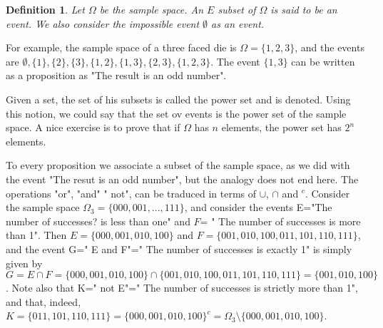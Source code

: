 \documentclass[12pt]{article}
\newtheorem{definition}[theorem]{Definition}
\newcommand{\<}{{\langle \!\! \langle}}
\renewcommand{\>}{{\rangle \!\! \rangle}}
\newcommand{\commento}[1]{
	\par\noindent
	\colorbox{light}{\begin{minipage}{120 mm}#1\end{minipage}}
	\par\noindent
}
\begin{document}
\begin{definition}
Let $\Omega$ be the sample space. An $E$ subset of $\Omega$ is said to be an event. We also consider the impossible event $\emptyset$ as an event.   
\end{definition}


For example, the sample space of a three faced die is $\Omega = \{1,2,3\}$, and the events are $\emptyset, \{1\}, \{2\}, \{3\}, \{1,2\}, \{1,3\}, \{2,3\}, \{1,2,3\}$. The event $\{1,3\}$ can be written as a proposition as "The result is an odd number".
\commento{ Given a set, the set of his subsets is called the power set and is denoted. Using this notion, we could say that the set ov events is the power set of the sample space. A nice exercise is to prove that if $\Omega$ has $n$ elements, the power set has $2^n$ elements.}
 
To every proposition we associate a subset of the sample space, as we did with the event "The resut is an odd number", but the analogy does not end here. The operations "or", "and" " not", can be traduced in terms of $\cup$, $\cap$ and $^c$. Consider the sample space $\Omega_3=\{000,001,...,111\}$, and consider the events E="The number of successes? is less than one" and $F$= " The number of successes is more than 1". Then $E=\{000,001,010,100\}$ and $F = \{001,010,100,011,101,110,111\}$, and the event G=" E and F"=" The number of successes is exactly 1" is simply given by $G=E\cap F= \{000,001,010,100\}\cap \{001,010,100,011,101,110,111\}=\{001,010,100\}$. Note also that K=" not E"=" The number of successes is strictly more than 1", and that, indeed, $K=\{011,101,110,111\}=\{000,001,010,100\}^c=\Omega_3\setminus \{000,001,010,100\}$.     

\end{document}
